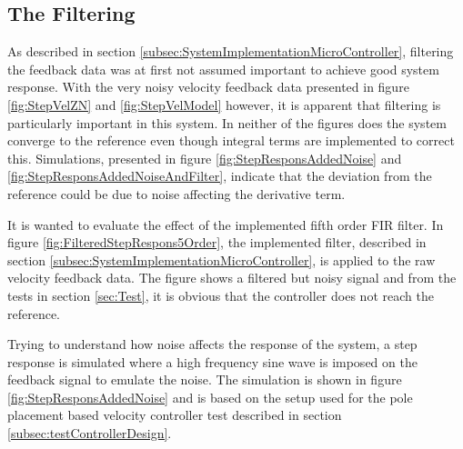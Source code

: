 \documentclass[../../main.tex]{subfiles}
\begin{document}


\subsection{The Filtering} \label{subsec:TheFiltering}
As described in section \ref{subsec:SystemImplementationMicroController}, filtering the feedback data was at first not assumed important to achieve good system response. With the very noisy velocity feedback data presented in figure \ref{fig:StepVelZN} and \ref{fig:StepVelModel} however, it is apparent that filtering is particularly important in this system. In neither of the figures does the system converge to the reference even though integral terms are implemented to correct this. Simulations, presented in figure \ref{fig:StepResponsAddedNoise} and \ref{fig:StepResponsAddedNoiseAndFilter}, indicate that the deviation from the reference could be due to noise affecting the derivative term.

It is wanted to evaluate the effect of the implemented fifth order FIR filter. In figure \ref{fig:FilteredStepRespons5Order}, the implemented filter, described in section \ref{subsec:SystemImplementationMicroController}, is applied to the raw velocity feedback data. The figure shows a filtered but noisy signal and from the tests in section \ref{sec:Test}, it is obvious that the controller does not reach the reference.


Trying to understand how noise affects the response of the system, a step response is simulated where a high frequency sine wave is imposed on the feedback signal to emulate the noise. The simulation is shown in figure \ref{fig:StepResponsAddedNoise} and is based on the setup used for the pole placement based velocity controller test described in section \ref{subsec:testControllerDesign}.
\end{document}
